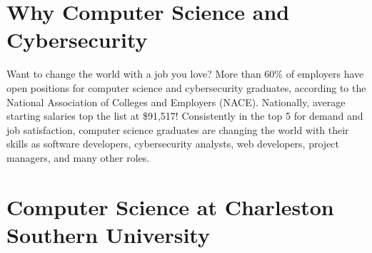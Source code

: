 %
\section*{Why Computer Science and Cybersecurity}
Want to change the world with a job you love? More than 60\% of employers have open positions for computer science and cybersecurity graduates, according to the National Association of Colleges and Employers (NACE). Nationally, average starting salaries top the list at \$91,517! Consistently in the top 5 for demand and job satisfaction, computer science graduates are changing the world with their skills as software developers, cybersecurity analysts, web developers, project managers, and many other roles.

\vspace{1.25em}
\section*{Computer Science at Charleston Southern University}
\vspace{-1.25em}
